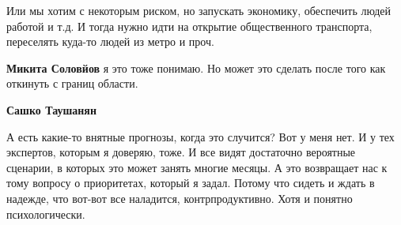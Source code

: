 \begin{itemize}
\begin{itemize}
Или мы хотим с некоторым риском, но запускать экономику, обеспечить людей
работой и т.д. И тогда нужно идти на открытие общественного транспорта,
переселять куда-то людей из метро и проч.

\textbf{Микита Соловйов} я это тоже понимаю. Но может это сделать после того как откинуть с границ области.

\textbf{Сашко Таушанян} 

А есть какие-то внятные прогнозы, когда это случится? Вот у меня нет. И у тех
экспертов, которым я доверяю, тоже. И все видят достаточно вероятные сценарии,
в которых это может занять многие месяцы. А это возвращает нас к тому вопросу о
приоритетах, который я задал. Потому что сидеть и ждать в надежде, что вот-вот
все наладится, контрпродуктивно. Хотя и понятно психологически.

\end{itemize} %


\end{itemize} %
